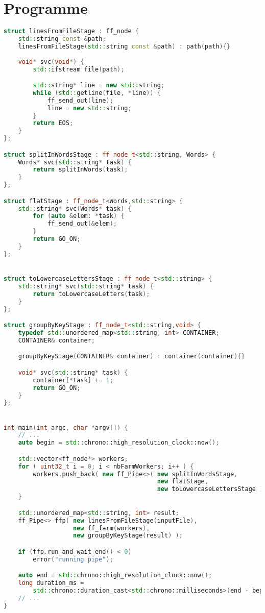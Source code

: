 \section{Programme }
\begin{lstlisting}[basicstyle=\ttfamily\footnotesize,language=c++]
struct linesFromFileStage : ff_node {
    std::string const &path;
    linesFromFileStage(std::string const &path) : path(path){}
    
    void* svc(void*) {
        std::ifstream file(path);

        std::string* line = new std::string;
        while (std::getline(file, *line)) {
            ff_send_out(line);
            line = new std::string;
        }
        return EOS;
    }
};

struct splitInWordsStage : ff_node_t<std::string, Words> {
    Words* svc(std::string* task) {
        return splitInWords(task);
    }
};

struct flatStage : ff_node_t<Words,std::string> {
    std::string* svc(Words* task) {
        for (auto &elem: *task) {
            ff_send_out(&elem);
        }
        return GO_ON;
    }
};


struct toLowercaseLettersStage : ff_node_t<std::string> {
    std::string* svc(std::string* task) {
        return toLowercaseLetters(task);
    }
};

struct groupByKeyStage : ff_node_t<std::string,void> {
    typedef std::unordered_map<std::string, int> CONTAINER;
    CONTAINER& container;

    groupByKeyStage(CONTAINER& container) : container(container){}

    void* svc(std::string* task) {
        container[*task] += 1;
        return GO_ON;
    }
};


int main(int argc, char *argv[]) {
    // ...
    auto begin = std::chrono::high_resolution_clock::now();

    std::vector<ff_node*> workers;
    for ( uint32_t i = 0; i < nbFarmWorkers; i++ ) {
        workers.push_back( new ff_Pipe<>( new splitInWordsStage,
                                          new flatStage,
                                          new toLowercaseLettersStage ) );
    }

    std::unordered_map<std::string, int> result;
    ff_Pipe<> ffp( new linesFromFileStage(inputFile),
                   new ff_farm(workers),
                   new groupByKeyStage(result) );

    if (ffp.run_and_wait_end() < 0) 
        error("running pipe");

    auto end = std::chrono::high_resolution_clock::now();
    long duration_ms = 
        std::chrono::duration_cast<std::chrono::milliseconds>(end - begin).count();
    // ...
}
\end{lstlisting}
